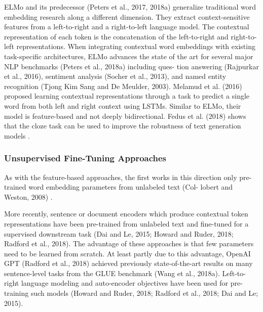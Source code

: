 \documentclass{report}
\begin{document}
ELMo and its predecessor (Peters et al., 2017, 2018a) generalize traditional word embedding research along a different dimension. They extract context-sensitive features from a left-to-right and a right-to-left language model. The contextual representation of each token is the concatenation of the left-to-right and right-to-left representations. When integrating contextual word embeddings with existing task-specific architectures, ELMo advances the state of the art for several major NLP benchmarks (Peters et al., 2018a) including ques- tion answering (Rajpurkar et al., 2016), sentiment analysis (Socher et al., 2013), and named entity recognition (Tjong Kim Sang and De Meulder, 2003). Melamud et al. (2016) proposed learning contextual representations through a task to predict a single word from both left and right context using LSTMs. Similar to ELMo, their model is feature-based and not deeply bidirectional. Fedus et al. (2018) shows that the cloze task can be used to improve the robustness of text generation models .

\subsubsection{Unsupervised Fine-Tuning Approaches}
\label{sssec:bert-unsupervised-fine-tuning-approaches}
As with the feature-based approaches, the first works in this direction only pre-trained word embedding parameters from unlabeled text (Col- lobert and Weston, 2008) .

More recently, sentence or document encoders which produce contextual token representations have been pre-trained from unlabeled text and fine-tuned for a supervised downstream task (Dai and Le, 2015; Howard and Ruder, 2018; Radford et al., 2018). The advantage of these approaches is that few parameters need to be learned from scratch. At least partly due to this advantage, OpenAI GPT (Radford et al., 2018) achieved previously state-of-the-art results on many sentence-level tasks from the GLUE benchmark (Wang et al., 2018a). Left-to-right language modeling and auto-encoder objectives have been used for pre-training such models (Howard and Ruder, 2018; Radford et al., 2018; Dai and Le; 2015).
\end{document}
